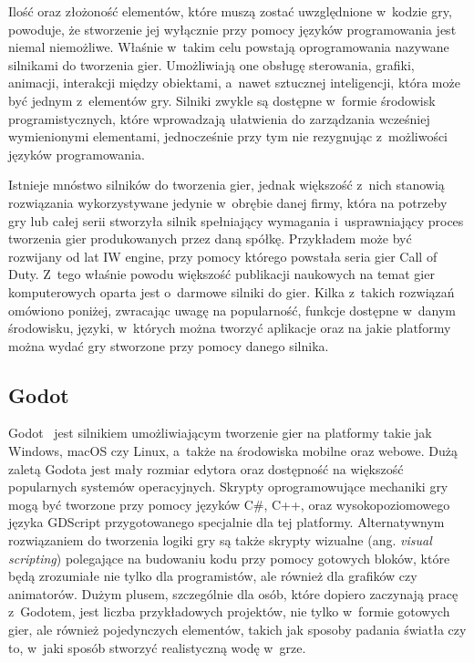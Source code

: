Ilość oraz złożoność elementów, które muszą zostać uwzględnione w~kodzie gry, powoduje, że stworzenie jej wyłącznie przy pomocy języków programowania jest niemal niemożliwe. Właśnie w~takim celu powstają oprogramowania nazywane silnikami do tworzenia gier. Umożliwiają one obsługę sterowania, grafiki, animacji, interakcji między obiektami, a~nawet sztucznej inteligencji, która może być jednym z~elementów gry. Silniki zwykle są dostępne w~formie środowisk programistycznych, które wprowadzają ułatwienia do zarządzania wcześniej wymienionymi elementami, jednocześnie przy tym nie rezygnując z~możliwości języków programowania. 

Istnieje mnóstwo silników do tworzenia gier, jednak większość z~nich stanowią rozwiązania wykorzystywane jedynie w~obrębie danej firmy, która na potrzeby gry lub całej serii stworzyła silnik spełniający wymagania i~usprawniający proces tworzenia gier produkowanych przez daną spółkę. Przykładem może być rozwijany od lat IW engine, przy pomocy którego powstała seria gier Call of Duty. Z~tego właśnie powodu większość publikacji naukowych na temat gier komputerowych oparta jest o~darmowe silniki do gier. Kilka z~takich rozwiązań omówiono poniżej, zwracając uwagę na popularność, funkcje dostępne w~danym środowisku, języki, w~których można tworzyć aplikacje oraz na jakie platformy można wydać gry stworzone przy pomocy danego silnika.

\subsection{Godot}
Godot~\cite{godot_documentation} jest silnikiem umożliwiającym tworzenie gier na platformy takie jak Windows, macOS czy Linux, a~także na środowiska mobilne oraz webowe. Dużą zaletą Godota jest mały rozmiar edytora oraz dostępność na większość popularnych systemów operacyjnych. Skrypty oprogramowujące mechaniki gry mogą być tworzone przy pomocy języków C\#, C++, oraz wysokopoziomowego języka GDScript przygotowanego specjalnie dla tej platformy. Alternatywnym rozwiązaniem do tworzenia logiki gry są także skrypty wizualne (ang. \textit{visual scripting}) polegające na budowaniu kodu przy pomocy gotowych bloków, które będą zrozumiałe nie tylko dla programistów, ale również dla grafików czy animatorów. Dużym plusem, szczególnie dla osób, które dopiero zaczynają pracę z~Godotem, jest liczba przykładowych projektów, nie tylko w~formie gotowych gier, ale również pojedynczych elementów, takich jak sposoby padania światła czy to, w~jaki sposób stworzyć realistyczną wodę w~grze. 

